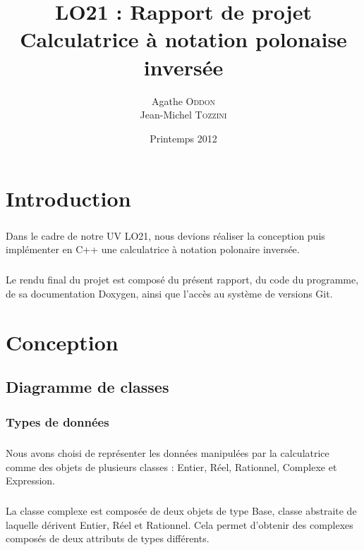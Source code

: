 \documentclass[a4paper,11pt]{report}
\begin{document}
\title{LO21 : Rapport de projet \\ Calculatrice à notation polonaise inversée}
\author{Agathe \textsc{Oddon} \\ Jean-Michel \textsc{Tozzini}}
\date{Printemps 2012}

\maketitle

\chapter*{Introduction}
	\paragraph{}Dans le cadre de notre UV LO21, nous devions réaliser la conception puis implémenter en C++ une calculatrice à notation polonaire inversée.

	\paragraph{}Le rendu final du projet est composé du présent rapport, du code du programme, de sa documentation Doxygen, ainsi que l'accès au système de versions Git.

\tableofcontents

\chapter{Conception}

	\section{Diagramme de classes}
		
		\subsection{Types de données}
			\paragraph{}Nous avons choisi de représenter les données manipulées par la calculatrice comme des objets de plusieurs classes : Entier, Réel, Rationnel, Complexe et Expression. 

			\paragraph{}La classe complexe est composée de deux objets de type Base, classe abstraite de laquelle dérivent Entier, Réel et Rationnel. Cela permet d'obtenir des complexes composés de deux attributs de types différents.
\end{document}
